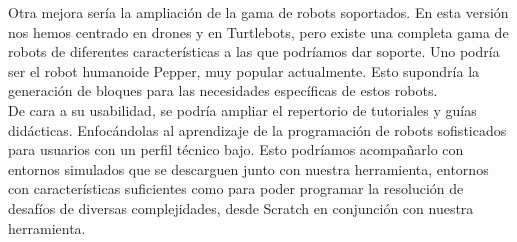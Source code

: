 Otra mejora sería la ampliación de la gama de robots soportados. En esta versión nos hemos centrado en drones y en Turtlebots, pero existe una completa gama de robots de diferentes características a las que podríamos dar soporte. Uno podría ser el robot humanoide Pepper, muy popular actualmente. Esto supondría la generación de bloques para las necesidades específicas de estos robots.\\

De cara a su usabilidad, se podría ampliar el repertorio de tutoriales y guías didácticas. Enfocándolas al aprendizaje de la programación de robots sofisticados para usuarios con un perfil técnico bajo. Esto podríamos acompañarlo con entornos simulados que se descarguen junto con nuestra herramienta, entornos con características suficientes como para poder programar la resolución de desafíos de diversas complejidades, desde Scratch en conjunción con nuestra herramienta.\\